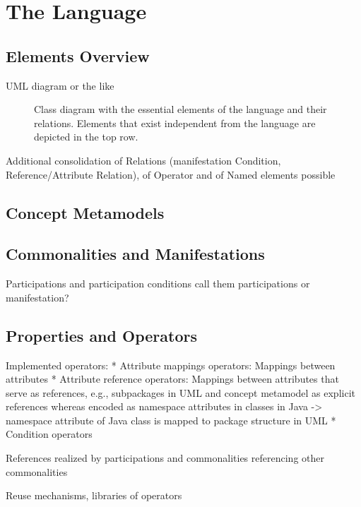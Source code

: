 \section{The \Commonalities Language}

\subsection{Elements Overview}
UML diagram or the like

\begin{figure}
    \centering
    
    \caption[\commonalities language elements]{Class diagram with the essential elements of the \commonalities language and their relations. Elements that exist independent from the language are depicted in the top row.}
    \label{fig:language:elements}
\end{figure}

Additional consolidation of Relations (manifestation Condition, Reference/Attribute Relation), of Operator and of Named elements possible

\subsection{Concept Metamodels}

\subsection{Commonalities and Manifestations}

Participations and participation conditions
call them participations or manifestation?

\subsection{Properties and Operators}
Implemented operators:
* Attribute mappings operators: Mappings between attributes
* Attribute reference operators: Mappings between attributes that serve as references, e.g., subpackages in UML and concept metamodel as explicit references whereas encoded as namespace attributes in classes in Java -> namespace attribute of Java class is mapped to package structure in UML
* Condition operators

References realized by participations and commonalities referencing other commonalities

Reuse mechanisms, libraries of operators

